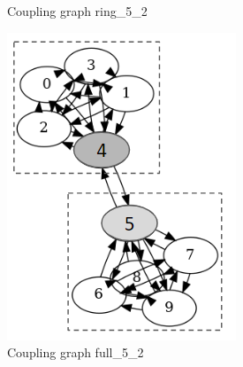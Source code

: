 \begin{figure}[!htb]
\begin{subfigure}{0.2\linewidth}
        \caption{Coupling graph ring\_5\_2}
        \label{fig:coupling-graph-ring}
    \end{subfigure}
    \hfill
    \begin{subfigure}{0.25\linewidth}
        \includegraphics[width=\linewidth]{image/coupling_graph_full.png}
        \caption{Coupling graph full\_5\_2}
        \label{fig:coupling-graph-full}
    \end{subfigure}
    \hfill
    \begin{subfigure}{0.4\linewidth}

\end{subfigure}
\end{figure}
